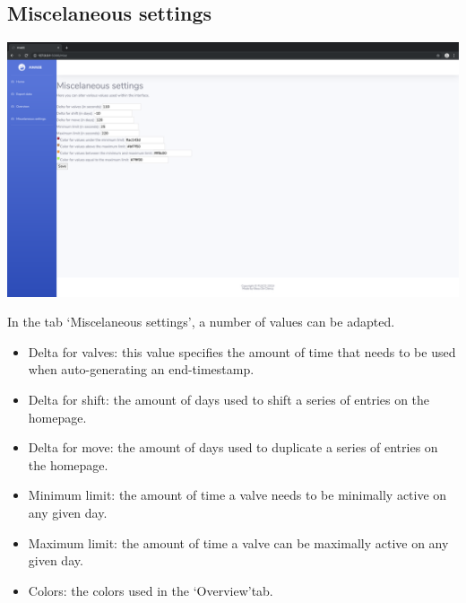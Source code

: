 \documentclass[12pt]{article}
\begin{document}
\subsection{Miscelaneous settings}
\begin{center}
	\includegraphics[width=\linewidth]{images/Misc_settings.png}
\end{center}
In the tab \lq Miscelaneous settings\rq, a number of values can be adapted.
\begin{itemize}
	\item Delta for valves: this value specifies the amount of time that needs to be used when auto-generating an end-timestamp.
	\item Delta for shift: the amount of days used to shift a series of entries on the homepage.
	\item Delta for move: the amount of days used to duplicate a series of entries on the homepage.
	\item Minimum limit: the amount of time a valve needs to be minimally active on any given day.
	\item Maximum limit: the amount of time a valve can be maximally active on any given day.
	\item Colors: the colors used in the \lq Overview\rq tab.
\end{itemize}
\end{document}
